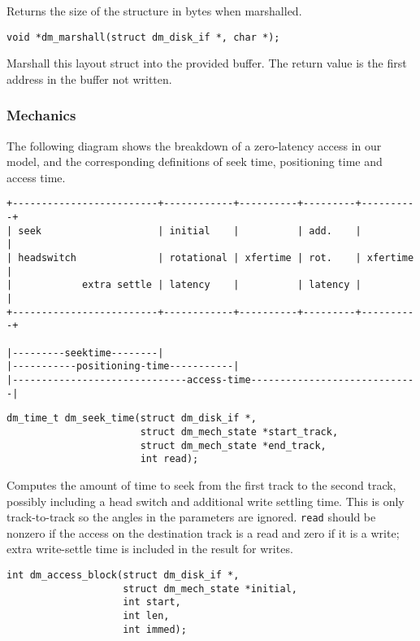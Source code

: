 Returns the size of the structure in bytes when marshalled.


\begin{verbatim}
void *dm_marshall(struct dm_disk_if *, char *);
\end{verbatim}

Marshall this layout struct into the provided buffer.  The return value is
the first address in the buffer not written.


\subsubsection{Mechanics}

The following diagram shows the breakdown of a zero-latency access in
our model, and the corresponding definitions of seek time, positioning
time and access time.

\begin{verbatim}
+-------------------------+------------+----------+---------+----------+
| seek                    | initial    |          | add.    |          |
| headswitch              | rotational | xfertime | rot.    | xfertime |
|            extra settle | latency    |          | latency |          |
+-------------------------+------------+----------+---------+----------+

|---------seektime--------|
|-----------positioning-time-----------|
|------------------------------access-time-----------------------------|
\end{verbatim}

\begin{verbatim}
dm_time_t dm_seek_time(struct dm_disk_if *, 
                       struct dm_mech_state *start_track,
                       struct dm_mech_state *end_track,
                       int read);
\end{verbatim}

Computes the amount of time to seek from the first track to the second
track, possibly including a head switch and additional write settling
time.  This is only track-to-track so the angles in the parameters are
ignored.  \texttt{read} should be nonzero if the access on the destination
track is a read and zero if it is a write; extra write-settle time is
included in the result for writes.

\begin{verbatim}
int dm_access_block(struct dm_disk_if *,
                    struct dm_mech_state *initial,
                    int start,
                    int len,
                    int immed);
\end{verbatim}

